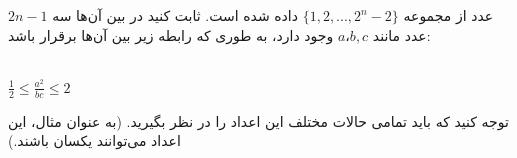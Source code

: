 $2n-1$
     عدد از مجموعه 
$\{1, 2, ..., 2^n-2\}$
 داده شده است. ثابت کنید در بین آن‌ها سه عدد مانند
$a، b, c $
 وجود دارد، به طوری که رابطه زیر بین آن‌ها برقرار باشد:\\ \\
    \centerline{$\frac{1}{2} \leq \frac{a^2}{bc} \leq 2$}
	\p
    توجه کنید که باید تمامی حالات مختلف این اعداد را در نظر بگیرید.
	\p
    (به عنوان مثال، این اعداد می‌توانند یکسان باشند.)